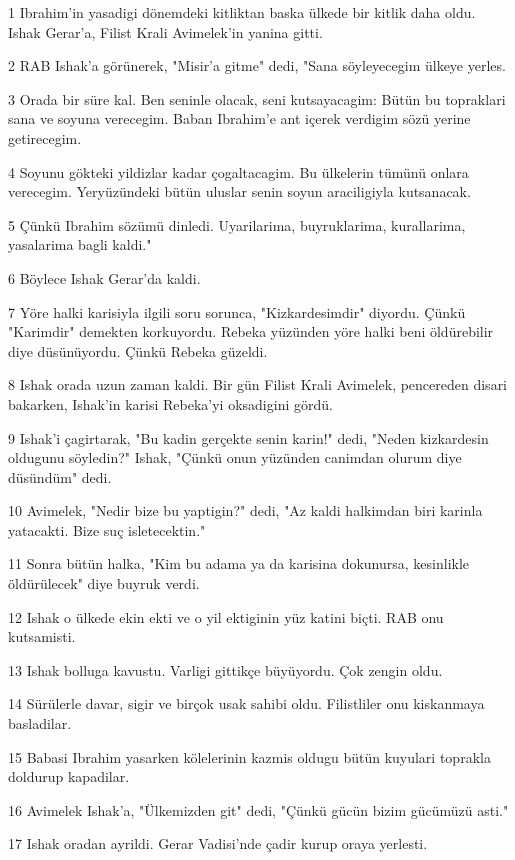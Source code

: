\par 1 Ibrahim'in yasadigi dönemdeki kitliktan baska ülkede bir kitlik daha oldu. Ishak Gerar'a, Filist Krali Avimelek'in yanina gitti.
\par 2 RAB Ishak'a görünerek, "Misir'a gitme" dedi, "Sana söyleyecegim ülkeye yerles.
\par 3 Orada bir süre kal. Ben seninle olacak, seni kutsayacagim: Bütün bu topraklari sana ve soyuna verecegim. Baban Ibrahim'e ant içerek verdigim sözü yerine getirecegim.
\par 4 Soyunu gökteki yildizlar kadar çogaltacagim. Bu ülkelerin tümünü onlara verecegim. Yeryüzündeki bütün uluslar senin soyun araciligiyla kutsanacak.
\par 5 Çünkü Ibrahim sözümü dinledi. Uyarilarima, buyruklarima, kurallarima, yasalarima bagli kaldi."
\par 6 Böylece Ishak Gerar'da kaldi.
\par 7 Yöre halki karisiyla ilgili soru sorunca, "Kizkardesimdir" diyordu. Çünkü "Karimdir" demekten korkuyordu. Rebeka yüzünden yöre halki beni öldürebilir diye düsünüyordu. Çünkü Rebeka güzeldi.
\par 8 Ishak orada uzun zaman kaldi. Bir gün Filist Krali Avimelek, pencereden disari bakarken, Ishak'in karisi Rebeka'yi oksadigini gördü.
\par 9 Ishak'i çagirtarak, "Bu kadin gerçekte senin karin!" dedi, "Neden kizkardesin oldugunu söyledin?" Ishak, "Çünkü onun yüzünden canimdan olurum diye düsündüm" dedi.
\par 10 Avimelek, "Nedir bize bu yaptigin?" dedi, "Az kaldi halkimdan biri karinla yatacakti. Bize suç isletecektin."
\par 11 Sonra bütün halka, "Kim bu adama ya da karisina dokunursa, kesinlikle öldürülecek" diye buyruk verdi.
\par 12 Ishak o ülkede ekin ekti ve o yil ektiginin yüz katini biçti. RAB onu kutsamisti.
\par 13 Ishak bolluga kavustu. Varligi gittikçe büyüyordu. Çok zengin oldu.
\par 14 Sürülerle davar, sigir ve birçok usak sahibi oldu. Filistliler onu kiskanmaya basladilar.
\par 15 Babasi Ibrahim yasarken kölelerinin kazmis oldugu bütün kuyulari toprakla doldurup kapadilar.
\par 16 Avimelek Ishak'a, "Ülkemizden git" dedi, "Çünkü gücün bizim gücümüzü asti."
\par 17 Ishak oradan ayrildi. Gerar Vadisi'nde çadir kurup oraya yerlesti.
